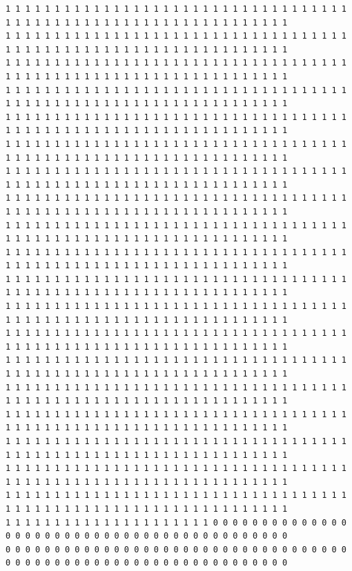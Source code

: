 \documentclass [10 pt, a4 paper]{report}
\begin{document}
\begin{lstlisting}[caption=Output of the simulation once it is finished, label={lst:code1}, frame=single]
1 1 1 1 1 1 1 1 1 1 1 1 1 1 1 1 1 1 1 1 1 1 1 1 1 1 1 1 1 1 1 1 1 1 1 1 1 1 1 1 1 1 1 1 1 1 1 1 1 1 1 1 1 1 1 1 1 1 1 1 1 1 1 1
1 1 1 1 1 1 1 1 1 1 1 1 1 1 1 1 1 1 1 1 1 1 1 1 1 1 1 1 1 1 1 1 1 1 1 1 1 1 1 1 1 1 1 1 1 1 1 1 1 1 1 1 1 1 1 1 1 1 1 1 1 1 1 1
1 1 1 1 1 1 1 1 1 1 1 1 1 1 1 1 1 1 1 1 1 1 1 1 1 1 1 1 1 1 1 1 1 1 1 1 1 1 1 1 1 1 1 1 1 1 1 1 1 1 1 1 1 1 1 1 1 1 1 1 1 1 1 1
1 1 1 1 1 1 1 1 1 1 1 1 1 1 1 1 1 1 1 1 1 1 1 1 1 1 1 1 1 1 1 1 1 1 1 1 1 1 1 1 1 1 1 1 1 1 1 1 1 1 1 1 1 1 1 1 1 1 1 1 1 1 1 1
1 1 1 1 1 1 1 1 1 1 1 1 1 1 1 1 1 1 1 1 1 1 1 1 1 1 1 1 1 1 1 1 1 1 1 1 1 1 1 1 1 1 1 1 1 1 1 1 1 1 1 1 1 1 1 1 1 1 1 1 1 1 1 1
1 1 1 1 1 1 1 1 1 1 1 1 1 1 1 1 1 1 1 1 1 1 1 1 1 1 1 1 1 1 1 1 1 1 1 1 1 1 1 1 1 1 1 1 1 1 1 1 1 1 1 1 1 1 1 1 1 1 1 1 1 1 1 1
1 1 1 1 1 1 1 1 1 1 1 1 1 1 1 1 1 1 1 1 1 1 1 1 1 1 1 1 1 1 1 1 1 1 1 1 1 1 1 1 1 1 1 1 1 1 1 1 1 1 1 1 1 1 1 1 1 1 1 1 1 1 1 1
1 1 1 1 1 1 1 1 1 1 1 1 1 1 1 1 1 1 1 1 1 1 1 1 1 1 1 1 1 1 1 1 1 1 1 1 1 1 1 1 1 1 1 1 1 1 1 1 1 1 1 1 1 1 1 1 1 1 1 1 1 1 1 1
1 1 1 1 1 1 1 1 1 1 1 1 1 1 1 1 1 1 1 1 1 1 1 1 1 1 1 1 1 1 1 1 1 1 1 1 1 1 1 1 1 1 1 1 1 1 1 1 1 1 1 1 1 1 1 1 1 1 1 1 1 1 1 1
1 1 1 1 1 1 1 1 1 1 1 1 1 1 1 1 1 1 1 1 1 1 1 1 1 1 1 1 1 1 1 1 1 1 1 1 1 1 1 1 1 1 1 1 1 1 1 1 1 1 1 1 1 1 1 1 1 1 1 1 1 1 1 1
1 1 1 1 1 1 1 1 1 1 1 1 1 1 1 1 1 1 1 1 1 1 1 1 1 1 1 1 1 1 1 1 1 1 1 1 1 1 1 1 1 1 1 1 1 1 1 1 1 1 1 1 1 1 1 1 1 1 1 1 1 1 1 1
1 1 1 1 1 1 1 1 1 1 1 1 1 1 1 1 1 1 1 1 1 1 1 1 1 1 1 1 1 1 1 1 1 1 1 1 1 1 1 1 1 1 1 1 1 1 1 1 1 1 1 1 1 1 1 1 1 1 1 1 1 1 1 1
1 1 1 1 1 1 1 1 1 1 1 1 1 1 1 1 1 1 1 1 1 1 1 1 1 1 1 1 1 1 1 1 1 1 1 1 1 1 1 1 1 1 1 1 1 1 1 1 1 1 1 1 1 1 1 1 1 1 1 1 1 1 1 1
1 1 1 1 1 1 1 1 1 1 1 1 1 1 1 1 1 1 1 1 1 1 1 1 1 1 1 1 1 1 1 1 1 1 1 1 1 1 1 1 1 1 1 1 1 1 1 1 1 1 1 1 1 1 1 1 1 1 1 1 1 1 1 1
1 1 1 1 1 1 1 1 1 1 1 1 1 1 1 1 1 1 1 1 1 1 1 1 1 1 1 1 1 1 1 1 1 1 1 1 1 1 1 1 1 1 1 1 1 1 1 1 1 1 1 1 1 1 1 1 1 1 1 1 1 1 1 1
1 1 1 1 1 1 1 1 1 1 1 1 1 1 1 1 1 1 1 1 1 1 1 1 1 1 1 1 1 1 1 1 1 1 1 1 1 1 1 1 1 1 1 1 1 1 1 1 1 1 1 1 1 1 1 1 1 1 1 1 1 1 1 1
1 1 1 1 1 1 1 1 1 1 1 1 1 1 1 1 1 1 1 1 1 1 1 1 1 1 1 1 1 1 1 1 1 1 1 1 1 1 1 1 1 1 1 1 1 1 1 1 1 1 1 1 1 1 1 1 1 1 1 1 1 1 1 1
1 1 1 1 1 1 1 1 1 1 1 1 1 1 1 1 1 1 1 1 1 1 1 1 1 1 1 1 1 1 1 1 1 1 1 1 1 1 1 1 1 1 1 1 1 1 1 1 1 1 1 1 1 1 1 1 1 1 1 1 1 1 1 1
1 1 1 1 1 1 1 1 1 1 1 1 1 1 1 1 1 1 1 1 1 1 1 1 1 1 1 1 1 1 1 1 1 1 1 1 1 1 1 1 1 1 1 1 1 1 1 1 1 1 1 1 1 1 1 1 1 1 1 1 1 1 1 1
1 1 1 1 1 1 1 1 1 1 1 1 1 1 1 1 1 1 1 1 1 0 0 0 0 0 0 0 0 0 0 0 0 0 0 0 0 0 0 0 0 0 0 0 0 0 0 0 0 0 0 0 0 0 0 0 0 0 0 0 0 0 0 0
0 0 0 0 0 0 0 0 0 0 0 0 0 0 0 0 0 0 0 0 0 0 0 0 0 0 0 0 0 0 0 0 0 0 0 0 0 0 0 0 0 0 0 0 0 0 0 0 0 0 0 0 0 0 0 0 0 0 0 0 0 0 0 0




\end{lstlisting}
\end{document}
